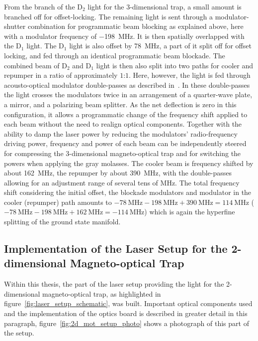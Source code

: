From the branch of the D$_2$ light for the 3-dimensional trap, a small amount is branched off for offset-locking. The remaining light is sent through a modulator-shutter combination for programmatic beam blocking as explained above, here with a modulator frequency of \SI{-198}{\mega\hertz}. It is then spatially overlapped with the D$_1$ light. The D$_1$ light is also offset by \SI{+78}{\mega\hertz}, a part of it split off for offset locking, and fed through an identical programmatic beam blockade. The combined beam of D$_2$ and D$_1$ light is then also split into two paths for cooler and repumper in a ratio of approximately $1$:$1$. Here, however, the light is fed through acousto-optical modulator double-passes as described in~\cite{qesja_design_2022}. In these double-passes the light crosses the modulators twice in an arrangement of a quarter-wave plate, a mirror, and a polarizing beam splitter. As the net deflection is zero in this configuration, it allows a programmatic change of the frequency shift applied to each beam without the need to realign optical components. Together with the ability to damp the laser power by reducing the modulators' radio-frequency driving power, frequency and power of each beam can be independently steered for compressing the 3-dimensional magneto-optical trap and for switching the powers when applying the gray molasses. The cooler beam is frequency shifted by about \SI{+162}{\mega\hertz}, the repumper by about \SI{+390}{\mega\hertz}, with the double-passes allowing for an adjustment range of several tens of \si{\mega\hertz}. The total frequency shift considering the initial offset, the blockade modulators and modulator in the cooler (repumper) path amounts to $\SI{-78}{\mega\hertz} - \SI{198}{\mega\hertz} + \SI{390}{\mega\hertz} = \SI{+114}{\mega\hertz}$ ($\SI{-78}{\mega\hertz} - \SI{198}{\mega\hertz} + \SI{162}{\mega\hertz} = \SI{-114}{\mega\hertz}$) which is again the hyperfine splitting of the ground state manifold.

\subsection*{Implementation of the Laser Setup for the 2-dimensional Magneto-optical Trap}
Within this thesis, the part of the laser setup providing the light for the 2-dimensional magneto-optical trap, as highlighted in figure~\ref{fig:laser_setup_schematic}, was built.
Important optical components used and the implementation of the optics board is described in greater detail in this paragraph, figure~\ref{fig:2d_mot_setup_photo} shows a photograph of this part of the setup.


